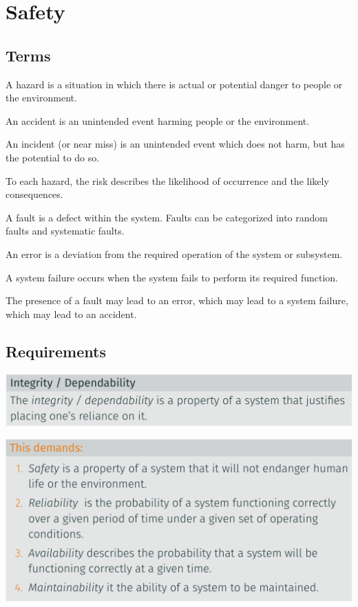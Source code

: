 \documentclass[
  10pt,
  a4paper,
  twocolumn]{article}
\providecommand{\tightlist}{%
  \setlength{\itemsep}{0pt}\setlength{\parskip}{0pt}}\usepackage{longtable,booktabs,array}
\begin{document}
\section{Safety}\label{safety}

\subsection{Terms}\label{terms}

\begin{description}
\tightlist
\item[Hazard]
A hazard is a situation in which there is actual or potential danger to
people or the environment.
\item[Accident]
An accident is an unintended event harming people or the environment.
\item[Incident]
An incident (or near miss) is an unintended event which does not harm,
but has the potential to do so.
\item[Risk]
To each hazard, the risk describes the likelihood of occurrence and the
likely consequences.
\item[Fault]
A fault is a defect within the system. Faults can be categorized into
random faults and systematic faults.
\item[Error]
An error is a deviation from the required operation of the system or
subsystem.
\item[System Failure]
A system failure occurs when the system fails to perform its required
function.
\item[Causalities]
The presence of a fault may lead to an error, which may lead to a system
failure, which may lead to an accident.
\end{description}

\subsection{Requirements}\label{requirements}

\includegraphics{images/safety/image-29.png}

\includegraphics{images/safety/image-30.png}
\end{document}
